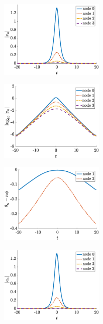 \documentclass[11pt,reqno]{amsart}
\begin{document}
\begin{figure}
    \centering
    \begin{subfigure}{0.3\linewidth}
        \caption{}
        \label{fig:m6025amp}
        \includegraphics[width=5cm]{m6phi025amp.eps}
    \end{subfigure}
    \begin{subfigure}{0.3\linewidth}
        \caption{}
        \label{fig:m6025logamp}
        \includegraphics[width=5cm]{m6phi025logamp.eps}
    \end{subfigure}
    \begin{subfigure}{0.3\linewidth}
        \caption{}
        \label{fig:m6025phase}
        \includegraphics[width=5cm]{m6phi025phase.eps}
    \end{subfigure}
    \begin{subfigure}{0.3\linewidth}
        \caption{}
        \label{fig:m6pi6amp}
        \includegraphics[width=5cm]{m6phipi6amp.eps}

\end{subfigure}
\end{figure}
\end{document}

